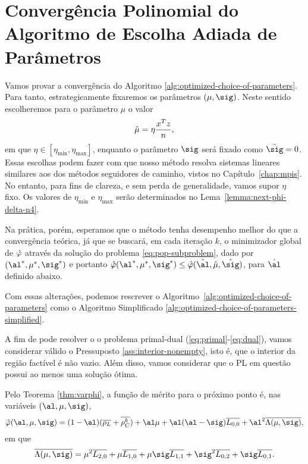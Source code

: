 

\section{Convergência  Polinomial do Algoritmo de Escolha Adiada de Parâmetros}



Vamos provar  a convergência do Algoritmo \ref{alg:optimized-choice-of-parameters}. Para tanto, estrategicamente fixaremos os parâmetros $(\mu,\sig)$. Neste sentido escolheremos para o parâmetro  $\mu$ o valor \[\hat{\mu}=\eta\dfrac{x^Tz}{n},
\] 
em que $\eta\in [\eta_{\min},\eta_{\max} ]$, enquanto o parâmetro $\sig$ será fixado como $\nextsig = 0$. Essas escolhas  podem fazer com que nosso método resolva  sistemas lineares similares aos dos métodos seguidores de caminho, vistos no Capítulo~\ref{chap:mpis}.  No entanto, para fins de clareza, e sem perda de generalidade, vamos supor $\eta$ fixo. Os valores de $\eta_{\min}$ e $\eta_{\max}$ serão determinados no Lema~\ref{lemma:next-phi-delta-n4}.


 Na prática, porém, esperamos que  o método  tenha desempenho melhor do que a convergência teórica, já que se buscará, em cada iteração $k$,
o minimizador global de $\hat{\varphi}$ através da solução do problema \eqref{eq:pop-subproblem}, dado por $(\al^*,\mu^*,\sig^*)$ e portanto	$\nextphi(\al^*,\mu^*,\sig^*)\leq \nextphi(\hat{\al},\nextmu,\nextsig)$, para  $\hat{\al}$ definido abaixo.


Com essas alterações, podemos rescrever o Algoritmo~\ref{alg:optimized-choice-of-parameters} como o  Algoritmo Simplificado \ref{alg:optimized-choice-of-parameters-simplified}.


A fim de pode  resolver o o problema primal-dual (\ref{eq:primal}-\ref{eq:dual}), vamos considerar válido o Pressuposto \ref{ass:interior-nonempty}, isto é, que o interior da região factível é não vazio. Além disso, vamos considerar que o \ac{PL} em questão possui ao menos uma solução ótima. 





Pelo Teorema \ref{thm:varphi}, a função de mérito para o próximo ponto   é, nas variáveis  $(\al,\mu,\sig)$,
\begin{equation*}
{\nextphi}(\al,\mu,\sig) =  (1-\al)(\dbvec{\rho_L} +
\dbvec{\rho_C^k }) + \al\mu + \al(\al-\sig)\dbvec{L_{0,0}} +
\al^2\dbvec{\Lambda(\mu,\sig)} ,
\end{equation*}
em que 
\[
\dbvec{\Lambda(\mu,\sig)} = \mu^2
 \dbvec{L_{2,0}} + \mu \dbvec{L_{1,0}} + 	\mu \sig \dbvec{L_{1,1}} +
 \sig^2 \dbvec{L_{0,2}} + \sig \dbvec{L_{0,1}}.
 \]


